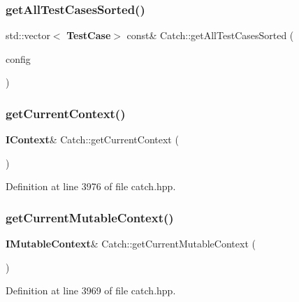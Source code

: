 \mbox{\label{namespace_catch_a1c9b1a23bc947ea70ddaabf067276cf2}} 
\subsubsection{getAllTestCasesSorted()}
{\footnotesize\ttfamily std\+::vector$<$\textbf{ Test\+Case}$>$ const\& Catch\+::get\+All\+Test\+Cases\+Sorted (\begin{DoxyParamCaption}\item[{\textbf{ I\+Config} const \&}]{config }\end{DoxyParamCaption})}

\mbox{\label{namespace_catch_ad517cca9b21deb79101e90e5508dd161}} 
\subsubsection{getCurrentContext()}
{\footnotesize\ttfamily \textbf{ I\+Context}\& Catch\+::get\+Current\+Context (\begin{DoxyParamCaption}{ }\end{DoxyParamCaption})\hspace{0.3cm}{\ttfamily [inline]}}



Definition at line 3976 of file catch.\+hpp.

\mbox{\label{namespace_catch_af7bb0c32ab2453d2f53e92a96d15360e}} 
\subsubsection{getCurrentMutableContext()}
{\footnotesize\ttfamily \textbf{ I\+Mutable\+Context}\& Catch\+::get\+Current\+Mutable\+Context (\begin{DoxyParamCaption}{ }\end{DoxyParamCaption})\hspace{0.3cm}{\ttfamily [inline]}}



Definition at line 3969 of file catch.\+hpp.

\mbox{\label{namespace_catch_a98d058468488c486a9cb5c8463f3ba29}} 

